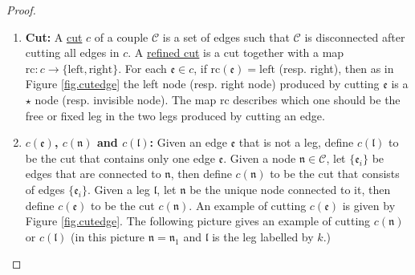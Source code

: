 \begin{proof}
\begin{defn}
\begin{enumerate}
    \item \textbf{Cut:} A \underline{cut} $c$ of a couple $\mathcal{C}$ is a set of edges such that $\mathcal{C}$ is disconnected after cutting all edges in $c$. A \underline{refined cut} is a cut together with a map $\text{rc}:c\rightarrow \{\text{left}, \text{right}\}$. For each $\mathfrak{e}\in c$, if $\text{rc}(\mathfrak{e})=\text{left}$ (resp. right), then as in Figure \ref{fig.cutedge} the left node (resp. right node) produced by cutting $\mathfrak{e}$ is a $\star$ node (resp. invisible node). The map $\text{rc}$ describes which one should be the free or fixed leg in the two legs produced by cutting an edge.
    \item \textbf{$c(\mathfrak{e})$, $c(\mathfrak{n})$ and $c(\mathfrak{l})$:} Given an edge $\mathfrak{e}$ that is not a leg, define  $c(\mathfrak{l})$ to be the cut that contains only one edge $\mathfrak{e}$. Given a node $\mathfrak{n}\in \mathcal{C}$, let $\{\mathfrak{e}_{i}\}$ be edges that are connected to $\mathfrak{n}$, then define $c(\mathfrak{n})$ to be the cut that consists of edges $\{\mathfrak{e}_{i}\}$. Given a leg $\mathfrak{l}$, let $\mathfrak{n}$ be the unique node connected to it, then define  $c(\mathfrak{e})$ to be the cut $c(\mathfrak{n})$. An example of cutting $c(\mathfrak{e})$ is given by Figure \ref{fig.cutedge}. The following picture gives an example of cutting $c(\mathfrak{n})$ or $c(\mathfrak{l})$ (in this picture $\mathfrak{n}=\mathfrak{n}_1$ and $\mathfrak{l}$ is the leg labelled by $k$.)
    
    \begin{figure}[H]
    \centering
\end{figure}
\end{enumerate}
\end{defn}
\end{proof}
